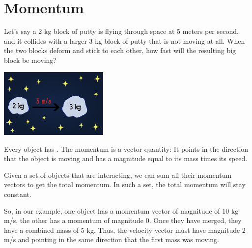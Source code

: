 \chapter{Momentum}

Let's say a 2 kg block of putty is flying through space at 5 meters
per second, and it collides with a larger 3 kg block of putty that is not
moving at all. When the two blocks deform and stick to each other, how
fast will the resulting big block be moving?

\includegraphics[width=0.4\textwidth]{Space_Putty.png}


Every object has .  The momentum is a vector
quantity: It points in the direction that the object is moving and has
a magnitude equal to its mass times its speed.

Given a set of objects that are interacting, we can sum all their
momentum vectors to get the total momentum.  In such a set, the total
momentum will stay constant.

So, in our example, one object has a momentum vector of magnitude of
10 kg m/s, the other has a momentum of magnitude 0.  Once they have
merged, they have a combined mass of 5 kg.  Thus, the velocity vector
must have magnitude 2 m/s and pointing in the same direction that the
first mass was moving.

